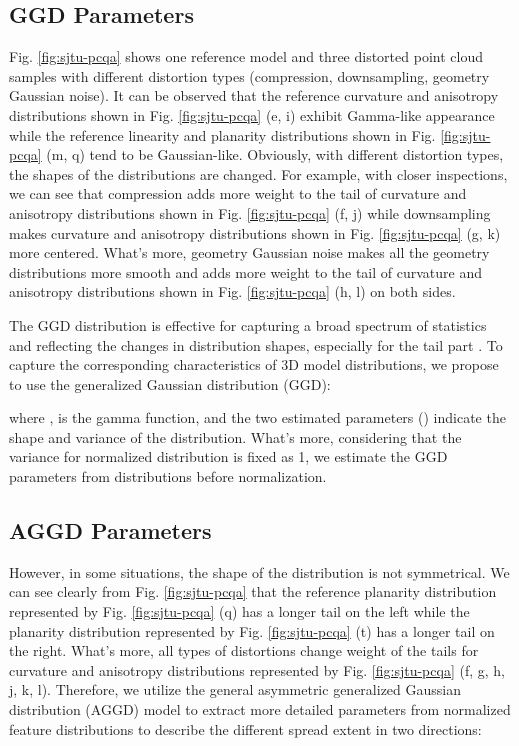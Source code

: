 \documentclass[lettersize,journal]{IEEEtran}
\begin{document}
\subsection{GGD Parameters}
Fig. \ref{fig:sjtu-pcqa} shows one reference model and three distorted point cloud samples with  different distortion types  (compression,  downsampling,  geometry  Gaussian  noise). It can be observed that the reference curvature and anisotropy distributions shown in Fig. \ref{fig:sjtu-pcqa} (e, i) exhibit Gamma-like appearance while the reference linearity and planarity distributions shown in Fig. \ref{fig:sjtu-pcqa} (m, q) tend to be Gaussian-like. Obviously, with different distortion types, the shapes of the distributions are changed. For example, with closer inspections, we can see that compression adds more weight to the tail of curvature and anisotropy distributions shown in Fig. \ref{fig:sjtu-pcqa} (f, j) while downsampling makes curvature and anisotropy distributions shown in Fig. \ref{fig:sjtu-pcqa} (g, k) more centered. What's more, geometry Gaussian noise makes all the geometry distributions more smooth and adds more weight to the tail of curvature and anisotropy distributions shown in Fig. \ref{fig:sjtu-pcqa} (h, l) on both sides. 

The GGD distribution is effective for capturing a broad spectrum of statistics and reflecting the changes in distribution shapes, especially for the tail part \cite{sharifi1995estimation}.
To capture the corresponding characteristics of 3D model distributions, we propose to use the generalized Gaussian distribution (GGD):

where ,  is the gamma function, and the two estimated parameters () indicate the shape and variance of the distribution. What's more, considering that the variance for normalized distribution is fixed as 1, we estimate the GGD parameters from distributions before normalization.  

\subsection{AGGD Parameters}
However, in some situations, the shape of the distribution is not symmetrical. We can see clearly from Fig. \ref{fig:sjtu-pcqa} that the reference planarity distribution represented by Fig. \ref{fig:sjtu-pcqa} (q) has a longer tail on the left while the planarity distribution represented by Fig. \ref{fig:sjtu-pcqa} (t) has a longer tail on the right. What's more, all types of distortions change weight of the tails for curvature and anisotropy distributions represented by Fig. \ref{fig:sjtu-pcqa} (f, g, h, j, k, l). Therefore, we utilize the general asymmetric generalized Gaussian distribution (AGGD) model to extract more detailed parameters from normalized feature distributions to describe the different spread extent in two directions:
\end{document}
